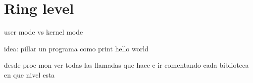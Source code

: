 \section{Ring level}

user mode vs kernel mode

idea: pillar un programa como print hello world

desde proc mon ver todas las llamadas que hace e ir comentando cada biblioteca 
en que nivel esta